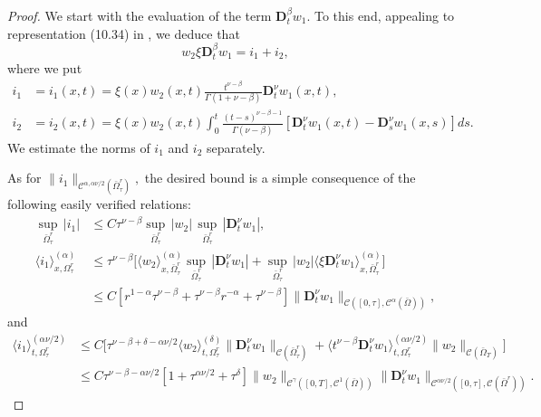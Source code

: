\documentclass[10pt,a4paper]{amsart}
\def\C {\mathcal{C}}
\begin{document}
\begin{proof}
We start with the evaluation of the term $\mathbf{D}_{t}^{\beta}w_1$. To this end, appealing to representation (10.34) in \cite{KPSV1}, we deduce that
\[
w_2\xi\mathbf{D}_{t}^{\beta}w_1=i_1+i_2,
\]
where we put
\begin{align*}
i_1&=i_1(x,t)=\xi(x)w_{2}(x,t)\frac{{t}^{\nu-\beta}}{\Gamma(1+
\nu-\beta)}\mathbf{D}_{t}^{\nu} w_1(x,t),\\
i_2&=i_2(x,t)=\xi(x)w_{2}(x,t)\int_{0}^{t}\frac{(t-s)^{\nu-\beta-1}}{\Gamma(\nu-\beta)}[\mathbf{D}_{t}^{\nu}w_{1}(x,t)-\mathbf{D}_{s}^{\nu}w_{1}(x,s)]ds.
\end{align*}
We estimate the norms of  $i_1$ and $i_2$ separately.

\smallskip
\noindent
As for $\|i_1\|_{\C^{\alpha,\alpha\nu/2}(\bar{\Omega}^{r}_{\tau})},$ the desired bound is a simple consequence of the following easily verified relations:
\begin{align*}
\underset{\bar{\Omega}^{r}_{\tau}}{\sup}\, |i_1|&\leq C\tau^{\nu-\beta}\underset{\bar{\Omega}^{r}_{\tau}}{\sup}\,|w_2|\,
\underset{\bar{\Omega}^{r}_{\tau}}{\sup}\,|\mathbf{D}_{t}^{\nu}w_{1}|,\\
\langle i_1\rangle_{x,\Omega^{r}_{\tau}}^{(\alpha)}&\leq\tau^{\nu-\beta}\Big[ \langle w_2\rangle_{x,\bar{\Omega}^{r}_{\tau}}^{(\alpha)}
\underset{\bar{\Omega}^{r}_{\tau}}{\sup}\,|\mathbf{D}_{t}^{\nu}w_{1}|
+\underset{\bar{\Omega}^{r}_{\tau}}{\sup}\,|w_2|
\langle \xi \mathbf{D}_{t}^{\nu}w_{1}\rangle_{x,\bar{\Omega}^{r}_{\tau}}^{(\alpha)}\Big]\\
&
\leq C[r^{1-\alpha}\tau^{\nu-\beta}+\tau^{\nu-\beta}r^{-\alpha}+\tau^{\nu-\beta}]\|\mathbf{D}_{t}^{\nu}w_{1}\|_{\C([0,\tau],\C^{\alpha}(\bar{\Omega}))},
\end{align*}
and
\begin{align*}
\langle i_1\rangle_{t,\Omega^{r}_{\tau}}^{(\alpha\nu/2)}&\leq C\Big[\tau^{\nu-\beta+\delta-\alpha\nu/2}\langle w_2\rangle_{t,\Omega^{r}_{\tau}}^{(\delta)}\|\mathbf{D}_{t}^{\nu}w_1\|_{\C(\bar{\Omega}_{\tau}^{r})}
+
\langle t^{\nu-\beta} \mathbf{D}_{t}^{\nu}w_1\rangle_{t,\Omega^{r}_{\tau}}^{(\alpha\nu/2)}\|w_2\|_{\C(\bar{\Omega}_{T})}\Big]\\
&
\leq
C\tau^{\nu-\beta-\alpha\nu/2}[1+\tau^{\alpha\nu/2}+\tau^{\delta}]\|w_2\|_{\C^{\gamma}([0,T],\C^{1}(\bar{\Omega}))}
\|\mathbf{D}_{t}^{\nu}w_1\|_{\C^{\alpha\nu/2}([0,\tau],\C(\bar{\Omega}^{r}))}.
\end{align*}


\end{proof}
\end{document}
